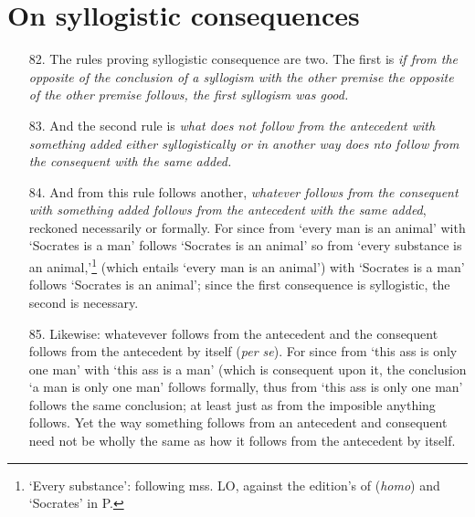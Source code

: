 \documentclass[]{article}
\begin{document}
\section{On syllogistic consequences}
\begin{itemize}
\item[82.] The rules proving syllogistic consequence are two. The first is \textit{if from the opposite of the conclusion of a syllogism with the other premise the opposite of the other premise follows, the first syllogism was good.}
\item[83.] And the second rule is \textit{what does not follow from the antecedent with something added either syllogistically or in another way does nto follow from the consequent with the same added.}
\item[84.] And from this rule follows another, \textit{whatever follows from the consequent with something added follows from the antecedent with the same added}, reckoned necessarily or formally. For since from `every man is an animal' with `Socrates is a man' follows `Socrates is an animal' so from `every substance is an animal,'\footnote{`Every substance': following mss. LO, against the edition's of (\textit{homo}) and `Socrates' in P.} (which entails `every man is an animal') with `Socrates is a man' follows `Socrates is an animal'; since the first consequence is syllogistic, the second is necessary.
\item[85.] Likewise: whatevever follows from the antecedent and the consequent follows from the antecedent by itself (\textit{per se}). For since from `this ass is only one man' with `this ass is a man' (which is consequent upon it, the conclusion `a man is only one man' follows formally, thus from `this ass is only one man' follows the same conclusion; at least just as from the imposible anything follows. Yet the way something follows from an antecedent and consequent need not be wholly the same as how it follows from the antecedent by itself.
\end{itemize}
\end{document}

